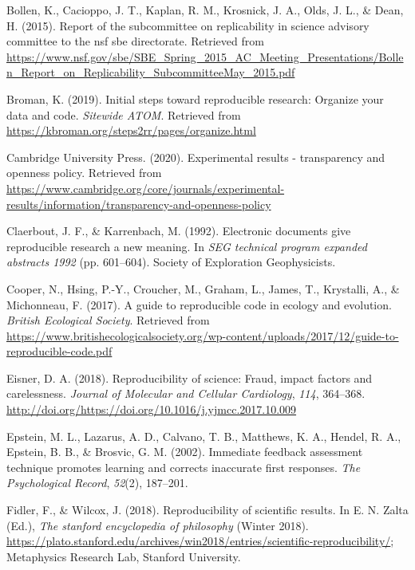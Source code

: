 \documentclass[12pt,twoside]{reedthesis}
\begin{document}
\leavevmode\hypertarget{ref-arlington}{}%
Bollen, K., Cacioppo, J. T., Kaplan, R. M., Krosnick, J. A., Olds, J. L., \& Dean, H. (2015). Report of the subcommittee on replicability in science advisory committee to the nsf sbe directorate. Retrieved from \url{https://www.nsf.gov/sbe/SBE_Spring_2015_AC_Meeting_Presentations/Bollen_Report_on_Replicability_SubcommitteeMay_2015.pdf}

\leavevmode\hypertarget{ref-broman}{}%
Broman, K. (2019). Initial steps toward reproducible research: Organize your data and code. \emph{Sitewide ATOM}. Retrieved from \url{https://kbroman.org/steps2rr/pages/organize.html}

\leavevmode\hypertarget{ref-exp-results}{}%
Cambridge University Press. (2020). Experimental results - transparency and openness policy. Retrieved from \url{https://www.cambridge.org/core/journals/experimental-results/information/transparency-and-openness-policy}

\leavevmode\hypertarget{ref-claerbout}{}%
Claerbout, J. F., \& Karrenbach, M. (1992). Electronic documents give reproducible research a new meaning. In \emph{SEG technical program expanded abstracts 1992} (pp. 601--604). Society of Exploration Geophysicists.

\leavevmode\hypertarget{ref-cooper2017guide}{}%
Cooper, N., Hsing, P.-Y., Croucher, M., Graham, L., James, T., Krystalli, A., \& Michonneau, F. (2017). A guide to reproducible code in ecology and evolution. \emph{British Ecological Society}. Retrieved from \url{https://www.britishecologicalsociety.org/wp-content/uploads/2017/12/guide-to-reproducible-code.pdf}

\leavevmode\hypertarget{ref-eisner-reproducibility}{}%
Eisner, D. A. (2018). Reproducibility of science: Fraud, impact factors and carelessness. \emph{Journal of Molecular and Cellular Cardiology}, \emph{114}, 364--368. \url{http://doi.org/https://doi.org/10.1016/j.yjmcc.2017.10.009}

\leavevmode\hypertarget{ref-epstein2002immediate}{}%
Epstein, M. L., Lazarus, A. D., Calvano, T. B., Matthews, K. A., Hendel, R. A., Epstein, B. B., \& Brosvic, G. M. (2002). Immediate feedback assessment technique promotes learning and corrects inaccurate first responses. \emph{The Psychological Record}, \emph{52}(2), 187--201.

\leavevmode\hypertarget{ref-sep-scientific-reproducibility}{}%
Fidler, F., \& Wilcox, J. (2018). Reproducibility of scientific results. In E. N. Zalta (Ed.), \emph{The stanford encyclopedia of philosophy} (Winter 2018). \url{https://plato.stanford.edu/archives/win2018/entries/scientific-reproducibility/}; Metaphysics Research Lab, Stanford University.
\end{document}
